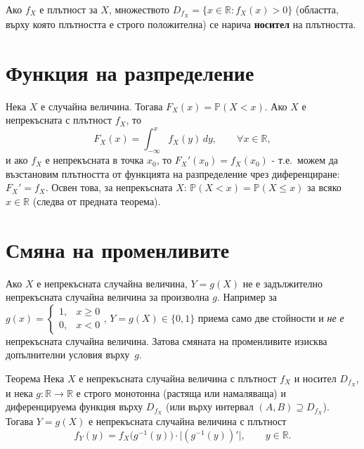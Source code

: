 \begin{defbox}
Ако $f_X$ е плътност за $X$, множеството $D_{f_X} = \{x\in\mathbb R :
f_X(x)>0\}$ (областта, върху която плътността е строго положителна)
се нарича \textbf{носител} на плътността.
\end{defbox}

\section{Функция на разпределение}

\begin{defbox}
Нека $X$ е случайна величина. Тогава $F_X(x) = \mathbb P(X<x)$. Ако
$X$ е непрекъсната с плътност $f_X$, то
\[
  F_X(x) = \int_{-\infty}^{x} f_X(y)\,dy, \qquad \forall x\in\mathbb R,
\]
и ако $f_X$ е непрекъсната в точка $x_0$, то $F_X'(x_0)=f_X(x_0)$ -
т.е.\ можем да възстановим плътността от функцията на разпределение
чрез диференциране: $F_X'=f_X$. Освен това, за непрекъсната $X$:
$\mathbb P(X<x)=\mathbb P(X\le x)$ за всяко $x\in\mathbb R$ (следва
от предната теорема).
\end{defbox}

\section{Смяна на променливите}

\begin{rembox}[Предупреждение]
Ако $X$ е непрекъсната случайна величина, $Y=g(X)$ не е задължително
непрекъсната случайна величина за произволна $g$. Например за
$g(x) = \begin{cases}1,&x\ge0\\0,&x<0\end{cases}$, $Y=g(X)\in\{0,1\}$
приема само две стойности и \emph{не е} непрекъсната случайна
величина. Затова смяната на променливите изисква допълнителни
условия върху~$g$.
\end{rembox}

\begin{thmbox}[]{Теорема}
Нека $X$ е непрекъсната случайна величина с плътност $f_X$ и носител
$D_{f_X}$, и нека $g:\mathbb R\to\mathbb R$ е строго монотонна
(растяща или намаляваща) и диференцируема функция върху $D_{f_X}$
(или върху интервал $(A,B)\supseteq D_{f_X}$). Тогава $Y=g(X)$ е
непрекъсната случайна величина с плътност
\[
  f_Y(y) = f_X\big(g^{-1}(y)\big)\cdot\big|(g^{-1}(y))'\big|, \qquad y\in\mathbb R.
\]
\end{thmbox}

